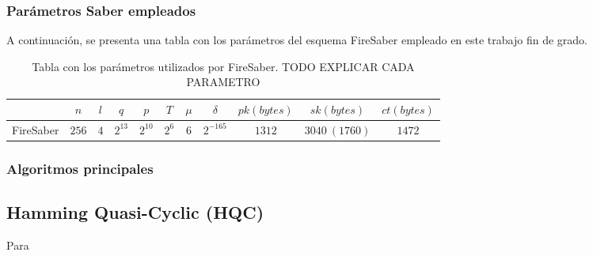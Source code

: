 \subsubsection{Parámetros Saber empleados}
A continuación, se presenta una tabla con los parámetros del esquema FireSaber empleado en este trabajo fin de grado.
\begin{table}[H]
	\centering
	\renewcommand{\arraystretch}{1.2}
	\begin{tabular}{lcccccccccc}
		\hline
		&\(n\)&\(l\)&\(q\)&\(p\)&\(T\)&\(\mu\)&\(\delta\)&\(pk (bytes)\)&\(sk (bytes)\)&\(ct (bytes)\)\\
		\hline
		FireSaber&\(256\)&\(4\)&\(2^{13}\)&\(2^{10}\)&\(2^{6}\)&\(6\)&\(2^{-165}\)&\(1312\)&\(3040 \ (1760)\)&\(1472\)\\
		\hline
	\end{tabular}
	\caption{Tabla con los parámetros utilizados por FireSaber. TODO EXPLICAR CADA PARAMETRO}
	\label{tab:KyberParams}
\end{table}

\subsubsection{Algoritmos principales \cite{saber-spec-2020}}
\subsection{Hamming Quasi-Cyclic (HQC)}
Para  \cite{hqc-spec-2022}


